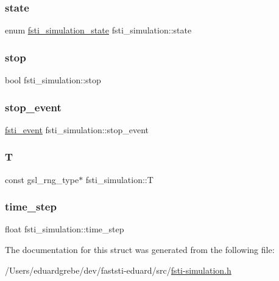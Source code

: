 \subsubsection{\texorpdfstring{state}{state}}
{\footnotesize\ttfamily enum \mbox{\hyperlink{fsti-simulation_8h_aa4feb4e18e0a72b142f028a7ddf75047}{fsti\+\_\+simulation\+\_\+state}} fsti\+\_\+simulation\+::state}

\mbox{\label{structfsti__simulation_a5f892cad24c8c5a9ed5f82ffa6c722b5}} 
\subsubsection{\texorpdfstring{stop}{stop}}
{\footnotesize\ttfamily bool fsti\+\_\+simulation\+::stop}

\mbox{\label{structfsti__simulation_a736379cc4da7cf9e95fb33a44c865f2f}} 
\subsubsection{\texorpdfstring{stop\+\_\+event}{stop\_event}}
{\footnotesize\ttfamily \mbox{\hyperlink{fsti-eventdefs_8h_abce6b23e84620b4f4433c952fa10f0b9}{fsti\+\_\+event}} fsti\+\_\+simulation\+::stop\+\_\+event}

\mbox{\label{structfsti__simulation_a9d284bb9be88b621ec2449d02df614dd}} 
\subsubsection{\texorpdfstring{T}{T}}
{\footnotesize\ttfamily const gsl\+\_\+rng\+\_\+type$\ast$ fsti\+\_\+simulation\+::T}

\mbox{\label{structfsti__simulation_a650011fbab62704c39b65cdd8cdb3a3d}} 
\subsubsection{\texorpdfstring{time\+\_\+step}{time\_step}}
{\footnotesize\ttfamily float fsti\+\_\+simulation\+::time\+\_\+step}



The documentation for this struct was generated from the following file\+:\begin{DoxyCompactItemize}
\item 
/\+Users/eduardgrebe/dev/faststi-\/eduard/src/\mbox{\hyperlink{fsti-simulation_8h}{fsti-\/simulation.\+h}}\end{DoxyCompactItemize}
